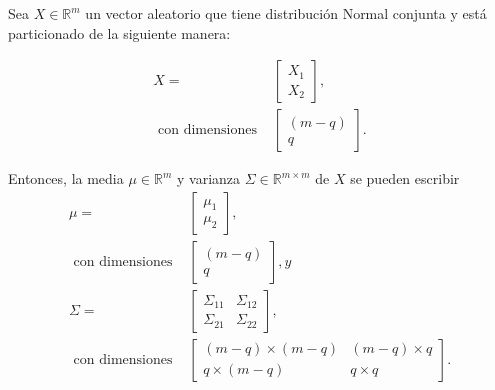 \begin{prop*}
    Sea $X \in \mathbb{R}^m$ un vector aleatorio que tiene distribuci\'on Normal conjunta y est\'a particionado de la siguiente manera:

    \begin{equation*}
    \begin{aligned}
        X = 
        &\left[
        \begin{array}{c}
            X_1  \\
            X_2
        \end{array}
        \right], \\
        \text{ con dimensiones }
        &\left[
        \begin{array}{c}
            (m-q)  \\
            q
        \end{array}
        \right].
    \end{aligned}
    \end{equation*}
    
    Entonces, la media $\mu \in \mathbb{R}^m$ y varianza $\Sigma \in \mathbb{R}^{m \times m}$ de $X$ se pueden escribir
    \begin{equation*}
    \begin{aligned}
        \mu = 
        &\left[
        \begin{array}{c}
            \mu_1  \\
            \mu_2
        \end{array}
        \right], \\
        \text{ con dimensiones }
        &\left[
        \begin{array}{c}
            (m-q)  \\
            q
        \end{array}
        \right], y\\
        \Sigma = 
        &\left[
        \begin{array}{cc}
            \Sigma_{11} & \Sigma_{12}  \\
            \Sigma_{21} & \Sigma_{22}
        \end{array}
        \right], \\
        \text{ con dimensiones }
        &\left[
        \begin{array}{cc}
            (m-q) \times (m-q)  & (m-q) \times q  \\
            q \times (m-q) & q \times q
        \end{array}
        \right].
    \end{aligned}
    \end{equation*}
    

\end{prop*}

